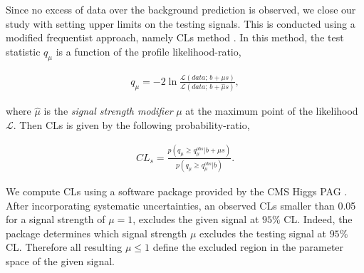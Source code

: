 Since no excess of data over the background prediction is observed, 
we close our study with setting upper limits on the testing signals.
This is conducted using a modified frequentist approach, namely CLs method \cite{read:CLs}.
In this method, the test statistic $q_\mu$ 
is a function of the profile likelihood-ratio,

\begin{align}
q_\mu = -2 \ln \frac{\mathcal{L}(data ;\, b + \mu s)}{\mathcal{L}(data ;\, b + \hat{\mu} s)},
\end{align}

where $\hat\mu$ is the \textit{signal strength modifier} $\mu$ at the maximum point of the likelihood $\mathcal{L}$.
Then CLs is given by the following probability-ratio,

\begin{align}
CL_s = \frac{p(q_\mu \geq q_\mu^{obs} | b + \mu s )}{p(q_\mu \geq q_\mu^{obs} | b)}.
\end{align}
 
We compute CLs using a software package provided by the CMS Higgs PAG \cite{higgspag:software}.
After incorporating systematic uncertainties, an observed CLs smaller than 0.05 for a signal strength of $\mu = 1$, excludes the given signal at $95\%$ CL. Indeed, the package determines which signal strength $\mu$ excludes the testing signal at $95\%$ CL. Therefore all resulting $\mu \leq 1$ define the excluded region in the parameter space of the given signal. 


